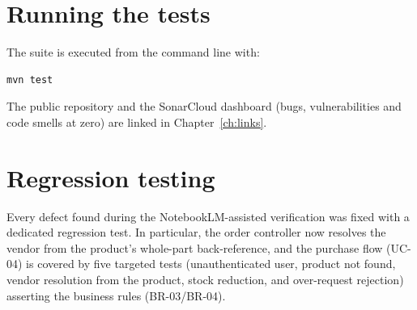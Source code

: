 \section{Running the tests}

The suite is executed from the command line with:

\begin{lstlisting}
mvn test
\end{lstlisting}

The public repository and the SonarCloud dashboard (bugs, vulnerabilities
and code smells at zero) are linked in
Chapter~\ref{ch:links}.

\section{Regression testing}

Every defect found during the NotebookLM-assisted verification was fixed with
a dedicated regression test. In particular, the order controller now resolves
the vendor from the product's whole-part back-reference, and the purchase flow
(UC-04) is covered by five targeted tests (unauthenticated user, product not
found, vendor resolution from the product, stock reduction, and over-request
rejection) asserting the business rules (BR-03/BR-04).
